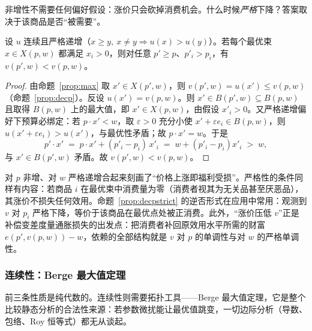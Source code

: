 非增性不需要任何偏好假设：涨价只会砍掉消费机会。什么时候\emph{严格}下降？答案取决于该商品是否“被需要”。

\begin{proposition}[严格递减的充分条件]
\label{prop:decpstrict}
设 $u$ 连续且严格递增（$x\ge y,\ x\ne y\Rightarrow u(x)>u(y)$）。若每个最优束 $x\in X(p,w)$ 都满足 $x_i>0$，则对任意 $p'\ge p$、$p'_i>p_i$，有 $v(p',w)<v(p,w)$。
\end{proposition}
\begin{proof}
由命题~\ref{prop:max} 取 $x'\in X(p',w)$，则 $v(p',w)=u(x')\le v(p,w)$（命题~\ref{prop:decp}）。反设 $u(x')=v(p,w)$。则 $x'\in B(p',w)\subseteq B(p,w)$ 且取得 $B(p,w)$ 上的最大值，即 $x'\in X(p,w)$，由假设 $x'_i>0$。又严格递增偏好下预算必绑定：若 $p\cdot x'<w$，取 $\varepsilon>0$ 充分小使 $x'+\varepsilon e_i\in B(p,w)$，则 $u(x'+\varepsilon e_i)>u(x')$，与最优性矛盾；故 $p\cdot x'=w$。于是
\[
p'\cdot x'\;=\;p\cdot x'+(p'_i-p_i)\,x'_i\;=\;w+(p'_i-p_i)x'_i\;>\;w,
\]
与 $x'\in B(p',w)$ 矛盾。故 $v(p',w)<v(p,w)$。
\end{proof}

对 $p$ 非增、对 $w$ 严格递增合起来刻画了“价格上涨即福利受损”。严格性的条件同样有内容：若商品 $i$ 在最优束中消费量为零（消费者视其为无关品甚至厌恶品），其涨价不损失任何效用。命题~\ref{prop:decpstrict} 的逆否形式在应用中常用：观测到 $v$ 对 $p_i$ 严格下降，等价于该商品在最优点处被正消费。此外，“涨价压低 $v$”正是补偿变差度量通胀损失的出发点：把消费者补回原效用水平所需的财富 $e(p',v(p,w))-w$，依赖的全部结构就是 $v$ 对 $p$ 的单调性与对 $w$ 的严格单调性。

\subsubsection{连续性：Berge 最大值定理}

前三条性质是纯代数的。连续性则需要拓扑工具——Berge 最大值定理，它是整个比较静态分析的合法性来源：若参数微扰能让最优值跳变，一切边际分析（导数、包络、Roy 恒等式）都无从谈起。

